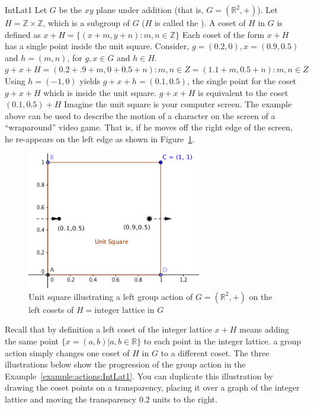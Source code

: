 \begin {example}{IntLat1}
Let $G$ be the $xy$ plane under addition (that is, $G=(\mathbb {R}^2,+)$).  Let $H=\mathbb{Z}\times \mathbb{Z}$, which is a subgroup of $G$ ($H$ is called the ).  
A coset of $H$ in $G$ is defined as $x+H=\{(x+m, y+n):m,n \in\mathbb{ Z}\}$
Each coset of the form $x+H$ has a single point inside the unit square.
Consider, $g=(0.2,0), x=(0.9,0.5)$ and  $h=(m,n)$, for $g,x\in G$ and $h\in H$.
  $g+x+H={(0.2+.9+m, 0+0.5+n):m, n \in Z}={(1.1+m, 0.5+n):m, n \in Z}$
Using $h= (-1, 0)$ yields $g+x+h=(0.1, 0.5)$, the single point for the coset $g+x+H $ which is inside the unit square.
$g+x+H$ is equivalent to the coset $(0.1, 0.5)+H$ 
Imagine the unit square is your computer screen.  The example above can be used to describe the motion of a character on the screen of a “wraparound'' video game.  That is, if he moves off the right edge of the screen, he re-appears on the left edge as shown in Figure~\ref{fig:UnitSquare}. 
\end{example}

\begin{figure}[ht]
\begin{center}
\includegraphics[width=3in]{images/UnitSquare.png}
\caption{Unit square illustrating a left group action of $G=(\mathbb {R}^2,+)$ on the left cosets of $H=\text{integer lattice}$ in $G$ }
\label{fig:UnitSquare}
\end{center}
\end{figure}

Recall that by definition a left coset of the integer lattice $x+H$  means adding the same point $\{x=(a,b)|a,b\in \mathbb{R}\}$ to each point in the integer lattice. a group action simply changes one coset of $H$ in $G$ to a different coset.  The three illustrations below show the progression of the group action  in the Example~\ref{example:actions:IntLat1}. You can duplicate this illustration by drawing the coset points on a transparency, placing it over a graph of the integer lattice and moving the transparency $0.2$ units to the right.

